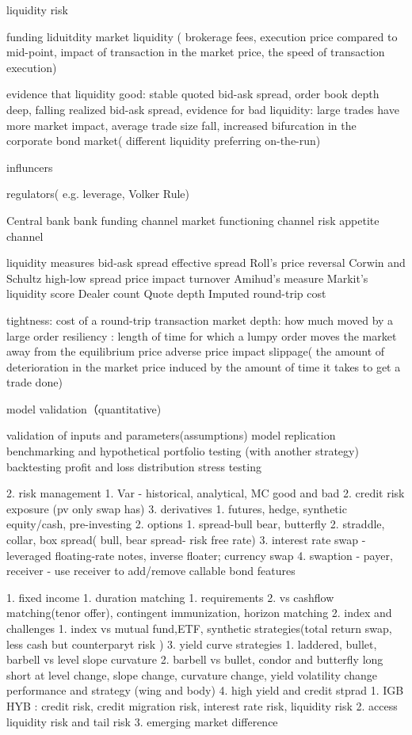 \documentclass[11pt, openany]{book}              %
\begin{document}
liquidity risk


funding liduitdity
market liquidity ( brokerage fees, execution price compared to mid-point, impact of transaction in the market price, the speed of transaction execution)


evidence that liquidity good: stable quoted bid-ask spread, order book depth deep, falling realized bid-ask spread, 
evidence for bad liquidity: large trades have more market impact, average trade size fall, increased bifurcation in the corporate bond market( different liquidity preferring on-the-run)


influncers

regulators( e.g. leverage, Volker Rule)

Central bank
  bank funding channel
  market functioning channel
 risk appetite channel

liquidity measures
bid-ask spread
effective spread
Roll’s price reversal 
Corwin and Schultz high-low spread 
price impact
turnover
Amihud’s measure
Markit’s liquidity score
Dealer count
Quote depth
Imputed round-trip cost






tightness: cost of a round-trip transaction
market depth: how much moved by a large order
resiliency : length of time for which a lumpy order moves the market away from the equilibrium price
adverse price impact
slippage( the amount of deterioration in the market price induced by the amount of time it takes to get a trade done)  


model validation（quantitative)

validation of inputs and parameters(assumptions)
model replication
benchmarking and hypothetical portfolio testing (with another strategy)
backtesting
profit and loss distribution
stress testing\

2. risk management
    1. Var - historical, analytical, MC good and bad
    2. credit risk exposure (pv only swap has)
3. derivatives  
    1. futures, hedge, synthetic equity/cash, pre-investing
    2. options
        1. spread-bull bear, butterfly   
        2. straddle, collar, box spread( bull, bear spread- risk free rate)
        3. interest rate swap - leveraged floating-rate notes, inverse floater; currency swap
        4. swaption - payer, receiver - use receiver to add/remove callable bond features 


1. fixed income
    1. duration matching 
        1. requirements
        2. vs cashflow matching(tenor offer), contingent immunization, horizon matching
    2. index and challenges 
        1. index vs mutual fund,ETF, synthetic strategies(total return swap, less cash but counterparyt risk )
    3. yield curve strategies
        1. laddered, bullet, barbell vs level slope curvature
        2. barbell vs bullet, condor and butterfly long short at level change, slope change, curvature change, yield volatility change performance and strategy (wing and body)
    4. high yield and credit stprad
        1. IGB HYB : credit risk, credit migration risk, interest rate risk, liquidity risk
        2. access liquidity risk and tail risk 
        3. emerging market difference 
\end{document}
